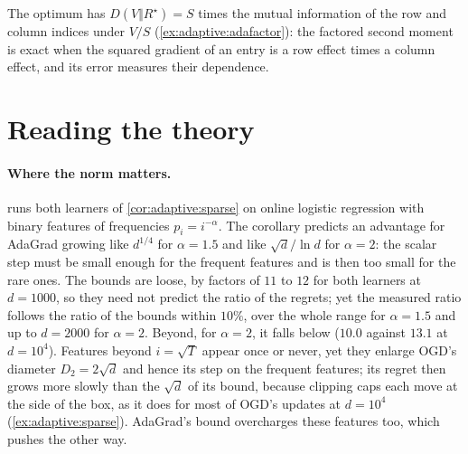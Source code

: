 \begin{refsection}
The optimum has $D(V\Vert R^\star)=S$ times the mutual information of the row and column indices under $V/S$ (\cref{ex:adaptive:adafactor}): the factored second moment is exact when the squared gradient of an entry is a row effect times a column effect, and its error measures their dependence.

\section{Reading the theory}\label{sec:adaptive:reading}

\paragraph{Where the norm matters.}  runs both learners of \cref{cor:adaptive:sparse} on online logistic regression with binary features of frequencies $p_i=i^{-\alpha}$. The corollary predicts an advantage for AdaGrad growing like $d^{1/4}$ for $\alpha=1.5$ and like $\sqrt d/\ln d$ for $\alpha=2$: the scalar step must be small enough for the frequent features and is then too small for the rare ones. The bounds are loose, by factors of $11$ to $12$ for both learners at $d=1000$, so they need not predict the ratio of the regrets; yet the measured ratio follows the ratio of the bounds within $10\%$, over the whole range for $\alpha=1.5$ and up to $d=2000$ for $\alpha=2$. Beyond, for $\alpha=2$, it falls below ($10.0$ against $13.1$ at $d=10^4$). Features beyond $i=\sqrt T$ appear once or never, yet they enlarge OGD's diameter $D_2=2\sqrt d$ and hence its step on the frequent features; its regret then grows more slowly than the $\sqrt d$ of its bound, because clipping caps each move at the side of the box, as it does for most of OGD's updates at $d=10^4$ (\cref{ex:adaptive:sparse}). AdaGrad's bound overcharges these features too, which pushes the other way.


\end{refsection}
